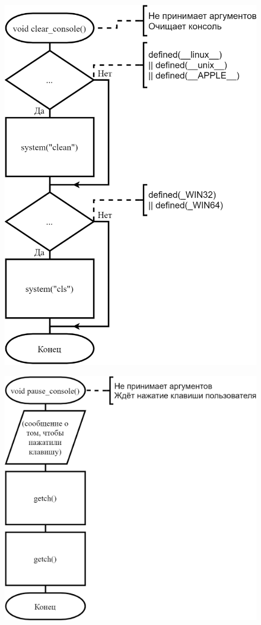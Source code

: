 \begin{figure}[!htp]
    \includegraphics{../src/libs/clear_console/clear_console.png}
\end{figure}

\begin{figure}[!htp]
    \includegraphics{../src/libs/pause_console/pause_console.png}
\end{figure}

